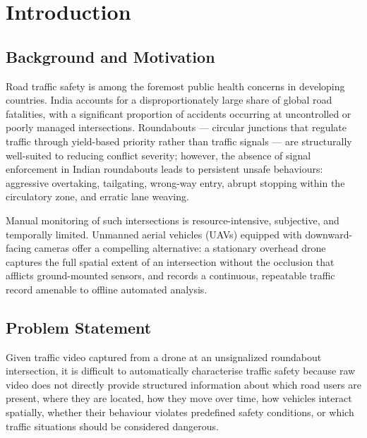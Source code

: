 \documentclass[12pt,a4paper]{report}
\begin{document}
\listoffigures\clearpage

\listoftables\clearpage

\fancyhf{}
\fancyhead[L]{\bfseries\small{\leftmark}}
\fancyhead[R]{\bfseries\small{\rightmark}}
\fancyfoot[C]{\bfseries\thepage}
\setcounter{page}{1}
\renewcommand{\labelenumi}{(\roman{enumi})}

\chapter{Introduction}
\label{chap:intro}

\section{Background and Motivation}

Road traffic safety is among the foremost public health concerns in developing countries.
India accounts for a disproportionately large share of global road fatalities, with a
significant proportion of accidents occurring at uncontrolled or poorly managed intersections.
Roundabouts --- circular junctions that regulate traffic through yield-based priority rather
than traffic signals --- are structurally well-suited to reducing conflict severity; however,
the absence of signal enforcement in Indian roundabouts leads to persistent unsafe behaviours:
aggressive overtaking, tailgating, wrong-way entry, abrupt stopping within the circulatory
zone, and erratic lane weaving.

Manual monitoring of such intersections is resource-intensive, subjective, and temporally
limited.  Unmanned aerial vehicles (UAVs) equipped with downward-facing cameras offer a
compelling alternative: a stationary overhead drone captures the full spatial extent of an
intersection without the occlusion that afflicts ground-mounted sensors, and records a
continuous, repeatable traffic record amenable to offline automated analysis.

\section{Problem Statement}

Given traffic video captured from a drone at an unsignalized roundabout intersection, it is
difficult to automatically characterise traffic safety because raw video does not directly
provide structured information about which road users are present, where they are located,
how they move over time, how vehicles interact spatially, whether their behaviour violates
predefined safety conditions, or which traffic situations should be considered dangerous.
\end{document}
